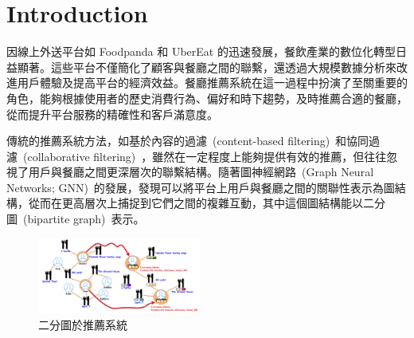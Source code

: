 \section{Introduction}
\label{sec:intro}

因線上外送平台如 Foodpanda 和 UberEat 的迅速發展，餐飲產業的數位化轉型日益顯著。這些平台不僅簡化了顧客與餐廳之間的聯繫，還透過大規模數據分析來改進用戶體驗及提高平台的經濟效益。餐廳推薦系統在這一過程中扮演了至關重要的角色，能夠根據使用者的歷史消費行為、偏好和時下趨勢，及時推薦合適的餐廳，從而提升平台服務的精確性和客戶滿意度。

傳統的推薦系統方法，如基於內容的過濾~(content-based filtering)~和協同過濾~(collaborative filtering)~，雖然在一定程度上能夠提供有效的推薦，但往往忽視了用戶與餐廳之間更深層次的聯繫結構。隨著圖神經網路~(Graph Neural Networks; GNN)~的發展，發現可以將平台上用戶與餐廳之間的關聯性表示為圖結構，從而在更高層次上捕捉到它們之間的複雜互動，其中這個圖結構能以二分圖~(bipartite graph)~表示。
\begin{figure}[tbh]
    \centering
    \includegraphics[width=0.48\textwidth]{img/bipartite_graph.pdf}
    \caption{二分圖於推薦系統~\cite{bipratite_fig}}
    \label{fig-bipartite}
\end{figure}

